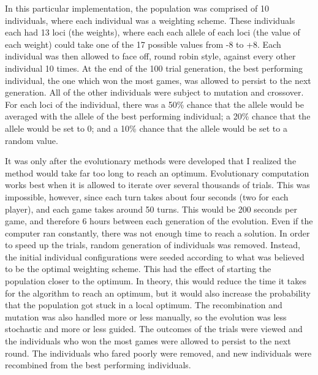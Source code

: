 \documentclass[]{article}
\begin{document}
In this particular implementation, the population was comprised of 10 individuals, where each individual was a weighting scheme. These individuals each had 13 loci (the weights), where each each allele of each loci (the value of each weight) could take one of the 17 possible values from -8 to +8. Each individual was then allowed to face off, round robin style, against every other individual 10 times. At the end of the 100 trial generation, the best performing individual, the one which won the most games, was allowed to persist to the next generation. All of the other individuals were subject to mutation and crossover. For each loci of the individual, there was a 50\% chance that the allele would be averaged with the allele of the best performing individual; a 20\% chance that the allele would be set to 0; and a 10\% chance that the allele would be set to a random value. 

It was only after the evolutionary methods were developed that I realized the method would take far too long to reach an optimum. Evolutionary computation works best when it is allowed to iterate over several thousands of trials. This was impossible, however, since each turn takes about four seconds (two for each player), and each game takes around 50 turns. This would be 200 seconds per game, and therefore 6 hours between each generation of the evolution. Even if the computer ran constantly, there was not enough time to reach a solution. In order to speed up the trials, random generation of individuals was removed. Instead, the initial individual configurations were seeded according to what was believed to be the optimal weighting scheme. This had the effect of starting the population closer to the optimum. In theory, this would reduce the time it takes for the algorithm to reach an optimum, but it would also increase the probability that the population got stuck in a local optimum. The recombination and mutation was also handled more or less manually, so the evolution was less stochastic and more or less guided. The outcomes of the trials were viewed and the individuals who won the most games were allowed to persist to the next round. The individuals who fared poorly were removed, and new individuals were recombined from the best performing individuals.



\end{document}
